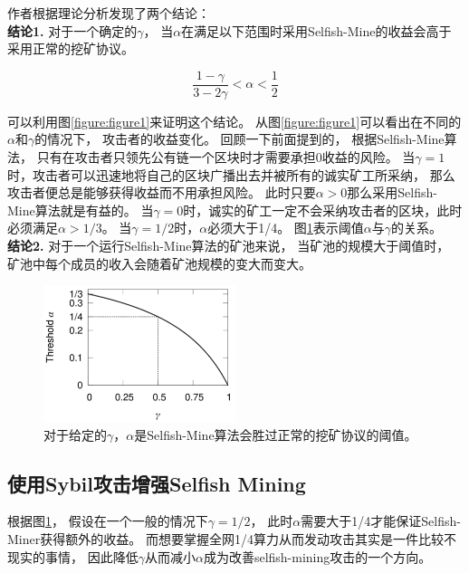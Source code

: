 \documentclass[a4paper, 11pt]{article}
\begin{document}
\begin{CJK*}{UTF8}{gbsn}
    作者根据理论分析发现了两个结论：\\

    \textbf{结论1.} 对于一个确定的$\gamma$，
    当$\alpha$在满足以下范围时采用Selfish-Mine的收益会高于采用正常的挖矿协议。

    \begin{equation}
        \frac{1-\gamma}{3-2\gamma} < \alpha < \frac{1}{2}
    \end{equation}

    可以利用图\ref{figure:figure1}来证明这个结论。
    从图\ref{figure:figure1}可以看出在不同的$\alpha$和$\gamma$的情况下，
    攻击者的收益变化。
    回顾一下前面提到的，
    根据Selfish-Mine算法，
    只有在攻击者只领先公有链一个区块时才需要承担0收益的风险。
    当$\gamma = 1$时，攻击者可以迅速地将自己的区块广播出去并被所有的诚实矿工所采纳，
    那么攻击者便总是能够获得收益而不用承担风险。
    此时只要$\alpha > 0$那么采用Selfish-Mine算法就是有益的。
    当$\gamma = 0$时，诚实的矿工一定不会采纳攻击者的区块，此时必须满足$\alpha > 1/3$。
    当$\gamma = 1/2$时，$\alpha$必须大于1/4。
    图\ref{figure:figure2}表示阈值$\alpha$与$\gamma$的关系。\\

    \textbf{结论2.} 对于一个运行Selfish-Mine算法的矿池来说，
    当矿池的规模大于阈值时，
    矿池中每个成员的收入会随着矿池规模的变大而变大。

    \begin{figure}[h]
        \centering
        \includegraphics[width=0.5\textwidth]{figure2}
        \caption{对于给定的$\gamma$，$\alpha$是Selfish-Mine算法会胜过正常的挖矿协议的阈值。}
        \label{figure:figure2}
    \end{figure}
    
    \subsection{使用Sybil攻击增强Selfish Mining}

    \indent

    根据图\ref{figure:figure2}，
    假设在一个一般的情况下$\gamma = 1/2$，
    此时$\alpha$需要大于1/4才能保证Selfish-Miner获得额外的收益。
    而想要掌握全网1/4算力从而发动攻击其实是一件比较不现实的事情，
    因此降低$\gamma$从而减小$\alpha$成为改善selfish-mining攻击的一个方向。


\end{CJK*}
\end{document}
